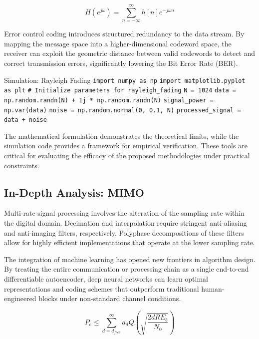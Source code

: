 \begin{equation}
    H(e^{j\omega}) = \sum_{n=-\infty}^{\infty} h[n] e^{-j\omega n}
\end{equation}

Error control coding introduces structured redundancy to the data stream. By mapping the message space into a higher-dimensional codeword space, the receiver can exploit the geometric distance between valid codewords to detect and correct transmission errors, significantly lowering the Bit Error Rate (BER).

\begin{pythonbox}{Simulation: Rayleigh Fading}
\texttt{import numpy as np}
\texttt{import matplotlib.pyplot as plt}
\texttt{}
\texttt{\# Initialize parameters for rayleigh\_fading}
\texttt{N = 1024}
\texttt{data = np.random.randn(N) + 1j * np.random.randn(N)}
\texttt{signal\_power = np.var(data)}
\texttt{noise = np.random.normal(0, 0.1, N)}
\texttt{processed\_signal = data + noise}
\end{pythonbox}

\vspace{0.5cm}
The mathematical formulation demonstrates the theoretical limits, while the simulation code provides a framework for empirical verification. These tools are critical for evaluating the efficacy of the proposed methodologies under practical constraints.


\subsection{In-Depth Analysis: MIMO}
Multi-rate signal processing involves the alteration of the sampling rate within the digital domain. Decimation and interpolation require stringent anti-aliasing and anti-imaging filters, respectively. Polyphase decompositions of these filters allow for highly efficient implementations that operate at the lower sampling rate.

The integration of machine learning has opened new frontiers in algorithm design. By treating the entire communication or processing chain as a single end-to-end differentiable autoencoder, deep neural networks can learn optimal representations and coding schemes that outperform traditional human-engineered blocks under non-standard channel conditions.

\begin{equation}
    P_e \leq \sum_{d=d_{free}}^{\infty} a_d Q\left(\sqrt{\frac{2 d R E_b}{N_0}}\right)
\end{equation}

